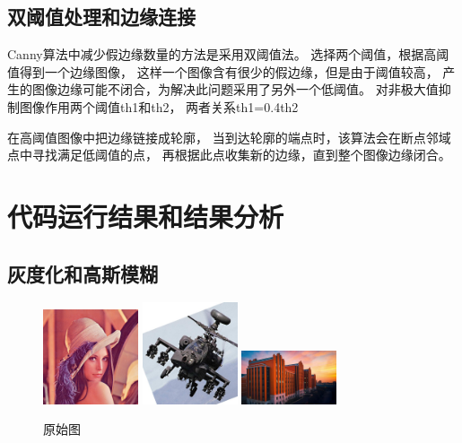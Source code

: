 \documentclass{article}
\begin{document}
\subsection{双阈值处理和边缘连接}

    Canny算法中减少假边缘数量的方法是采用双阈值法。
    选择两个阈值，根据高阈值得到一个边缘图像，
    这样一个图像含有很少的假边缘，但是由于阈值较高，
    产生的图像边缘可能不闭合，为解决此问题采用了另外一个低阈值。
    对非极大值抑制图像作用两个阈值th1和th2，
    两者关系th1=0.4th2

    在高阈值图像中把边缘链接成轮廓，
    当到达轮廓的端点时，该算法会在断点邻域点中寻找满足低阈值的点，
    再根据此点收集新的边缘，直到整个图像边缘闭合。

\section{代码运行结果和结果分析}

\subsection{灰度化和高斯模糊}
\newpage

\begin{figure}[h]
    \centering
    \includegraphics[width=0.25\textwidth]{./dataset/1}
    \includegraphics[width=0.25\textwidth]{./dataset/2}
    \includegraphics[width=0.25\textwidth]{./dataset/3}
    \caption{原始图}
\end{figure}
\end{document}
